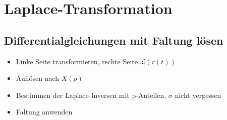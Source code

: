 \chapter{Laplace-Transformation}


\section{Differentialgleichungen mit Faltung lösen}
\begin{itemize}
	\item Linke Seite transformieren, rechte Seite \glqq{}$\mathcal{L}(r(t))$\grqq{}
	\item Auflösen nach $X(p)$
	\item Bestimmen der Laplace-Inversen mit p-Anteilen, $\sigma$ nicht vergessen
	\item Faltung anwenden
\end{itemize}

